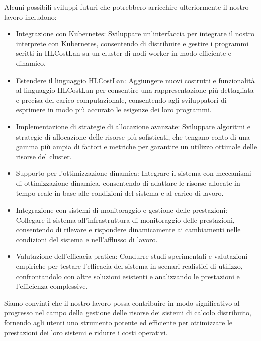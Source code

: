 \documentclass[../../main.tex]{subfiles}
\begin{document}
Alcuni possibili sviluppi futuri che potrebbero arricchire ulteriormente il nostro lavoro includono:
\begin{itemize}
    \item Integrazione con Kubernetes: Sviluppare un'interfaccia per integrare il nostro interprete con Kubernetes, consentendo di distribuire e gestire i programmi scritti in HLCostLan su un cluster di nodi worker in modo efficiente e dinamico.
    \item Estendere il linguaggio HLCostLan: Aggiungere nuovi costrutti e funzionalità al linguaggio HLCostLan per consentire una rappresentazione più dettagliata e precisa del carico computazionale, consentendo agli sviluppatori di esprimere in modo più accurato le esigenze dei loro programmi.
    \item Implementazione di strategie di allocazione avanzate: Sviluppare algoritmi e strategie di allocazione delle risorse più sofisticati, che tengano conto di una gamma più ampia di fattori e metriche per garantire un utilizzo ottimale delle risorse del cluster.
    \item Supporto per l'ottimizzazione dinamica: Integrare il sistema con meccanismi di ottimizzazione dinamica, consentendo di adattare le risorse allocate in tempo reale in base alle condizioni del sistema e al carico di lavoro.
    \item  Integrazione con sistemi di monitoraggio e gestione delle prestazioni: Collegare il sistema all'infrastruttura di monitoraggio delle prestazioni, consentendo di rilevare e rispondere dinamicamente ai cambiamenti nelle condizioni del sistema e nell'afflusso di lavoro.
    \item Valutazione dell'efficacia pratica: Condurre studi sperimentali e valutazioni empiriche per testare l'efficacia del sistema in scenari realistici di utilizzo, confrontandolo con altre soluzioni esistenti e analizzando le prestazioni e l'efficienza complessive.
\end{itemize}

Siamo convinti che il nostro lavoro possa contribuire in modo significativo al progresso nel campo della gestione delle risorse dei sistemi di calcolo distribuito, fornendo agli utenti uno strumento potente ed efficiente per ottimizzare le prestazioni dei loro sistemi e ridurre i costi operativi.
\end{document}
